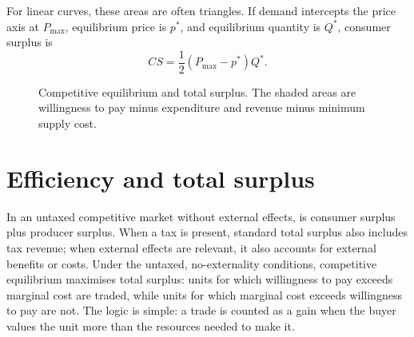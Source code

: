 For linear curves, these areas are often triangles. If demand intercepts the
price axis at $P_{\max}$, equilibrium price is $p^*$, and equilibrium quantity
is $Q^*$, consumer surplus is
\[
CS=\frac{1}{2}(P_{\max}-p^*)Q^*.
\]

\begin{figure}[htbp]
  \centering
  \caption{Competitive equilibrium and total surplus. The shaded areas are
  willingness to pay minus expenditure and revenue minus minimum supply cost.}
  \label{fig:competitive-surplus}
\end{figure}
\FloatBarrier

\section{Efficiency and total surplus}

In an untaxed competitive market without external effects,
 is consumer surplus plus producer surplus. When a tax
is present, standard total surplus also includes tax revenue; when external
effects are relevant, it also accounts for external benefits or costs. Under
the untaxed, no-externality conditions, competitive equilibrium maximises
total surplus: units for which willingness to pay exceeds marginal cost are
traded, while units for which marginal cost exceeds willingness to pay are
not. The logic is simple: a trade is counted as a gain when the buyer values
the unit more than the resources needed to make it.

